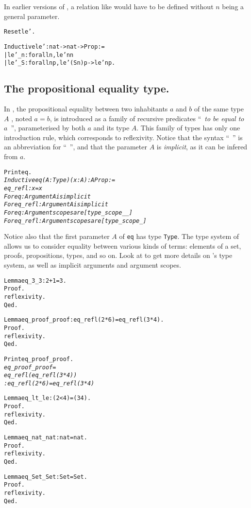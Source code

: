 \documentclass[11pt]{article}
\begin{document}
In earlier versions of {\coq}, a relation like  would have to be
defined without $n$ being a general parameter.

\begin{alltt}
Reset le'.

Inductive le': nat-> nat -> Prop :=
 | le'_n : forall n, le' n n
 | le'_S : forall n p, le' (S n) p -> le' n p.
\end{alltt}




\subsection{The propositional equality type.} \label{equality}
In {\coq}, the propositional equality between two inhabitants $a$ and
$b$ of
the same type $A$ ,
noted $a=b$, is introduced as a family of recursive predicates
``~\textsl{to be equal to $a$}~'',  parameterised by both $a$ and its type
$A$. This family of types has only one introduction rule, which
corresponds to reflexivity.
Notice that the syntax ``~'' is an abbreviation
for ``~'', and that the parameter $A$ is \emph{implicit},
as it can be infered from $a$.
\begin{alltt}
Print eq.
\it{} Inductive eq (A : Type) (x : A) : A \arrow{} Prop :=
    eq_refl : x = x
For eq: Argument A is implicit
For eq_refl: Argument A is implicit
For eq: Argument scopes are [type_scope _ _]
For eq_refl: Argument scopes are [type_scope _]
\end{alltt}

Notice also that  the first parameter $A$ of \texttt{eq} has type
\texttt{Type}. The type system of {\coq} allows us to consider equality between
various kinds of terms: elements of a set, proofs, propositions,
types, and so on.
Look at \cite{coqrefman, coqart} to get more details on {\coq}'s type
system, as well as implicit arguments and argument scopes.


\begin{alltt}
Lemma eq_3_3 : 2 + 1 = 3.
Proof.
 reflexivity.
Qed.

Lemma eq_proof_proof : eq_refl (2*6) = eq_refl (3*4).
Proof.
 reflexivity.
Qed.

Print eq_proof_proof.
\it eq_proof_proof =
eq_refl (eq_refl (3 * 4))
     : eq_refl (2 * 6) = eq_refl (3 * 4)
\tt

Lemma eq_lt_le : ( 2 < 4) = (3 {\coqle} 4).
Proof.
 reflexivity.
Qed.

Lemma eq_nat_nat : nat = nat.
Proof.
 reflexivity.
Qed.

Lemma eq_Set_Set : Set = Set.
Proof.
 reflexivity.
Qed.
\end{alltt}
\end{document}
